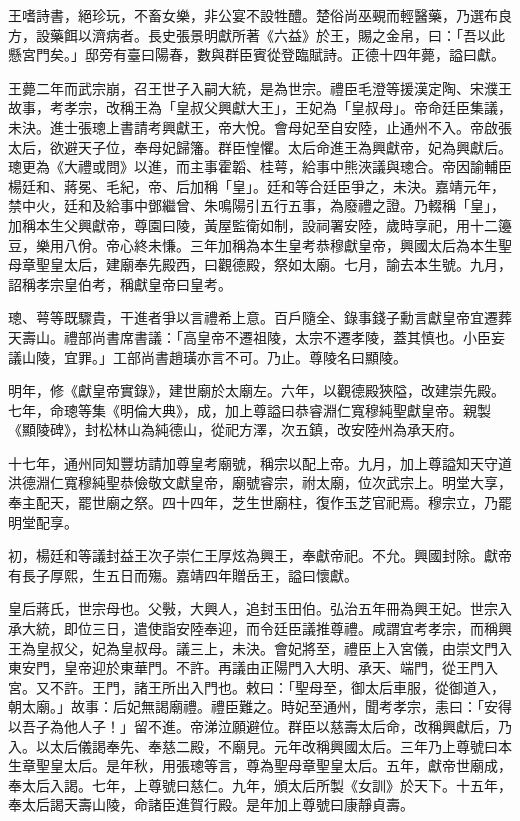 王嗜詩書，絕珍玩，不畜女樂，非公宴不設牲醴。楚俗尚巫覡而輕醫藥，乃選布良方，設藥餌以濟病者。長史張景明獻所著《六益》於王，賜之金帛，曰：「吾以此懸宮門矣。」邸旁有臺曰陽春，數與群臣賓從登臨賦詩。正德十四年薨，謚曰獻。

王薨二年而武宗崩，召王世子入嗣大統，是為世宗。禮臣毛澄等援漢定陶、宋濮王故事，考孝宗，改稱王為「皇叔父興獻大王」，王妃為「皇叔母」。帝命廷臣集議，未決。進士張璁上書請考興獻王，帝大悅。會母妃至自安陸，止通州不入。帝啟張太后，欲避天子位，奉母妃歸籓。群臣惶懼。太后命進王為興獻帝，妃為興獻后。璁更為《大禮或問》以進，而主事霍韜、桂萼，給事中熊浹議與璁合。帝因諭輔臣楊廷和、蔣冕、毛紀，帝、后加稱「皇」。廷和等合廷臣爭之，未決。嘉靖元年，禁中火，廷和及給事中鄧繼曾、朱鳴陽引五行五事，為廢禮之證。乃輟稱「皇」，加稱本生父興獻帝，尊園曰陵，黃屋監衛如制，設祠署安陸，歲時享祀，用十二籩豆，樂用八佾。帝心終未慊。三年加稱為本生皇考恭穆獻皇帝，興國太后為本生聖母章聖皇太后，建廟奉先殿西，曰觀德殿，祭如太廟。七月，諭去本生號。九月，詔稱孝宗皇伯考，稱獻皇帝曰皇考。

璁、萼等既驟貴，干進者爭以言禮希上意。百戶隨全、錄事錢子勳言獻皇帝宜遷葬天壽山。禮部尚書席書議：「高皇帝不遷祖陵，太宗不遷孝陵，蓋其慎也。小臣妄議山陵，宜罪。」工部尚書趙璜亦言不可。乃止。尊陵名曰顯陵。

明年，修《獻皇帝實錄》，建世廟於太廟左。六年，以觀德殿狹隘，改建崇先殿。七年，命璁等集《明倫大典》，成，加上尊謚曰恭睿淵仁寬穆純聖獻皇帝。親製《顯陵碑》，封松林山為純德山，從祀方澤，次五鎮，改安陸州為承天府。

十七年，通州同知豐坊請加尊皇考廟號，稱宗以配上帝。九月，加上尊謚知天守道洪德淵仁寬穆純聖恭儉敬文獻皇帝，廟號睿宗，祔太廟，位次武宗上。明堂大享，奉主配天，罷世廟之祭。四十四年，芝生世廟柱，復作玉芝官祀焉。穆宗立，乃罷明堂配享。

初，楊廷和等議封益王次子崇仁王厚炫為興王，奉獻帝祀。不允。興國封除。獻帝有長子厚熙，生五日而殤。嘉靖四年贈岳王，謚曰懷獻。

皇后蔣氏，世宗母也。父斅，大興人，追封玉田伯。弘治五年冊為興王妃。世宗入承大統，即位三日，遣使詣安陸奉迎，而令廷臣議推尊禮。咸謂宜考孝宗，而稱興王為皇叔父，妃為皇叔母。議三上，未決。會妃將至，禮臣上入宮儀，由崇文門入東安門，皇帝迎於東華門。不許。再議由正陽門入大明、承天、端門，從王門入宮。又不許。王門，諸王所出入門也。敕曰：「聖母至，御太后車服，從御道入，朝太廟。」故事：后妃無謁廟禮。禮臣難之。時妃至通州，聞考孝宗，恚曰：「安得以吾子為他人子！」留不進。帝涕泣願避位。群臣以慈壽太后命，改稱興獻后，乃入。以太后儀謁奉先、奉慈二殿，不廟見。元年改稱興國太后。三年乃上尊號曰本生章聖皇太后。是年秋，用張璁等言，尊為聖母章聖皇太后。五年，獻帝世廟成，奉太后入謁。七年，上尊號曰慈仁。九年，頒太后所製《女訓》於天下。十五年，奉太后謁天壽山陵，命諸臣進賀行殿。是年加上尊號曰康靜貞壽。


